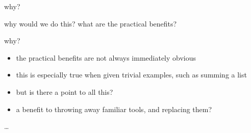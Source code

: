\begin{frame}
\begin{block}{why?}
\begin{center}
why would we do this? what are the practical benefits?
\end{center}
\end{block}
\end{frame}

\begin{frame}
\begin{block}{why?}
\begin{center}
\begin{itemize}
\item<1-> the practical benefits are not always immediately obvious
\item<2-> this is especially true when given trivial examples, such as summing a list
\item<3-> but is there a point to all this?
\item<4-> a benefit to throwing away familiar tools, and replacing them?
\end{itemize}
\end{center}
\end{block}
\end{frame}

\begin{frame}
\begin{center}
\ldots
\end{center}
\end{frame}
